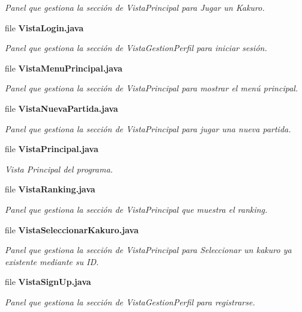 \begin{DoxyCompactItemize}
\begin{DoxyCompactList}\small\item\em Panel que gestiona la sección de Vista\+Principal para Jugar un Kakuro. \end{DoxyCompactList}\item 
file \textbf{ Vista\+Login.\+java}
\begin{DoxyCompactList}\small\item\em Panel que gestiona la sección de Vista\+Gestion\+Perfil para iniciar sesión. \end{DoxyCompactList}\item 
file \textbf{ Vista\+Menu\+Principal.\+java}
\begin{DoxyCompactList}\small\item\em Panel que gestiona la sección de Vista\+Principal para mostrar el menú principal. \end{DoxyCompactList}\item 
file \textbf{ Vista\+Nueva\+Partida.\+java}
\begin{DoxyCompactList}\small\item\em Panel que gestiona la sección de Vista\+Principal para jugar una nueva partida. \end{DoxyCompactList}\item 
file \textbf{ Vista\+Principal.\+java}
\begin{DoxyCompactList}\small\item\em Vista Principal del programa. \end{DoxyCompactList}\item 
file \textbf{ Vista\+Ranking.\+java}
\begin{DoxyCompactList}\small\item\em Panel que gestiona la sección de Vista\+Principal que muestra el ranking. \end{DoxyCompactList}\item 
file \textbf{ Vista\+Seleccionar\+Kakuro.\+java}
\begin{DoxyCompactList}\small\item\em Panel que gestiona la sección de Vista\+Principal para Seleccionar un kakuro ya existente mediante su ID. \end{DoxyCompactList}\item 
file \textbf{ Vista\+Sign\+Up.\+java}
\begin{DoxyCompactList}\small\item\em Panel que gestiona la sección de Vista\+Gestion\+Perfil para registrarse. \end{DoxyCompactList}\end{DoxyCompactItemize}
